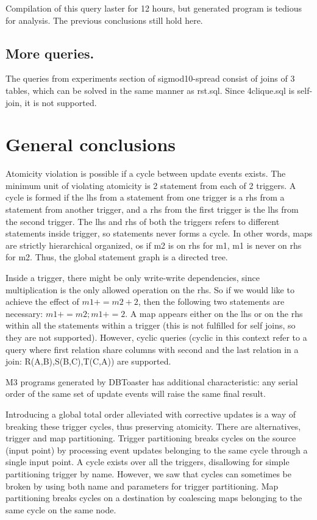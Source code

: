 \documentclass{sig-semester}
\begin{document}
Compilation of this query laster for 12 hours, but generated program is tedious for analysis. The previous conclusions still hold here.

\subsection{More queries.}
The queries from experiments section of sigmod10-spread consist of joins of 3 tables, which can be solved in the same manner as rst.sql. Since 4clique.sql is self-join, it is not supported.

\section{General conclusions}
\vspace{2mm}
Atomicity violation is possible if a cycle between update events exists. The minimum unit of violating atomicity is 2 statement from each of 2 triggers. A cycle is formed if the lhs from a statement from one trigger is a rhs from a statement from another trigger, and a rhs from the first trigger is the lhs from the second trigger. The lhs and rhs of both the triggers refers to different statements inside trigger, so statements never forms a cycle. In other words, maps are strictly hierarchical organized, os if m2 is on rhs for m1, m1 is never on rhs for m2. Thus, the global statement graph is a directed tree.

Inside a trigger, there might be only write-write dependencies, since multiplication is the only allowed operation on the rhs. So if we would like to achieve the effect of $m1+=m2+2$, then the following two statements are necessary: $m1+=m2; m1+=2$. A map appears either on the lhs or on the rhs within all the statements within a trigger (this is not fulfilled for self joins, so they are not supported). However, cyclic queries (cyclic in this context refer to a query where first relation share columns with second and the last relation in a join: R(A,B),S(B,C),T(C,A)) are supported.

M3 programs generated by DBToaster has additional characteristic: any serial order of the same set of update events will raise the same final result.

Introducing a global total order alleviated with corrective updates is a way of breaking these trigger cycles, thus preserving atomicity. There are alternatives, trigger and map partitioning. Trigger partitioning breaks cycles on the source (input point) by processing event updates belonging to the same cycle through a single input point. A cycle exists over all the triggers, disallowing for simple partitioning trigger by name. However, we saw that cycles can sometimes be broken by using both name and parameters for trigger partitioning. Map partitioning breaks cycles on a destination by coalescing maps belonging to the same cycle on the same node.
\end{document}
